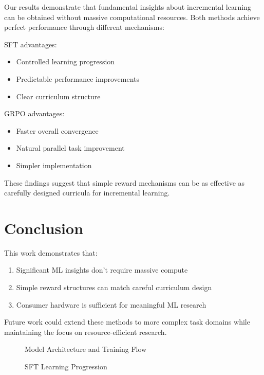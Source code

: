 \documentclass[11pt]{article}
\begin{document}
Our results demonstrate that fundamental insights about incremental learning can be obtained without massive computational resources. Both methods achieve perfect performance through different mechanisms:

SFT advantages:
\begin{itemize}
    \item Controlled learning progression
    \item Predictable performance improvements
    \item Clear curriculum structure
\end{itemize}

GRPO advantages:
\begin{itemize}
    \item Faster overall convergence
    \item Natural parallel task improvement
    \item Simpler implementation
\end{itemize}

These findings suggest that simple reward mechanisms can be as effective as carefully designed curricula for incremental learning.

\section{Conclusion}

This work demonstrates that:
\begin{enumerate}
    \item Significant ML insights don't require massive compute
    \item Simple reward structures can match careful curriculum design
    \item Consumer hardware is sufficient for meaningful ML research
\end{enumerate}

Future work could extend these methods to more complex task domains while maintaining the focus on resource-efficient research.

\begin{figure}[H]
    \centering
    \caption{Model Architecture and Training Flow}
    \label{fig:architecture}
\end{figure}

\begin{figure}[H]
    \centering
    \caption{SFT Learning Progression}
    \label{fig:sft}
\end{figure}
\end{document}
